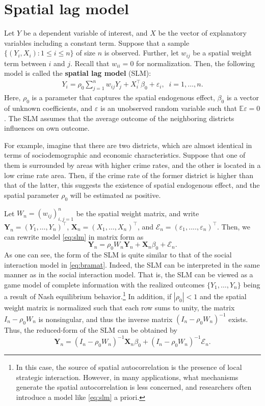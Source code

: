 \documentclass[10.5pt, A4paper, openany, uplatex]{book}
\newcommand{\mbf}{\mathbf}
\newcommand{\mcl}{\mathcal}
\newcommand{\eps}{\varepsilon}
\newcommand{\E}{\mathbb{E}}
\numberwithin{equation}{section}
\begin{document}
\section{Spatial lag model}\label{sec:SLM}

Let $Y$ be a dependent variable of interest, and $X$ be the vector of explanatory variables including a constant term.
Suppose that a sample $\{(Y_i,X_i): 1 \le i \le n\}$ of size $n$ is observed.
Further, let $w_{ij}$ be a spatial weight term between $i$ and $j$.
Recall that $w_{ii} = 0$ for normalization.
Then, the following model is called the \textbf{spatial lag model} (SLM):
\begin{align}\label{eq:slm}
	Y_i = \rho_0 \sum_{j = 1}^n w_{ij} Y_j + X_i^\top\beta_0 + \eps_i, \;\; i = 1,\ldots,n.
\end{align}
Here, $\rho_0$ is a parameter that captures the spatial endogenous effect, $\beta_0$ is a vector of unknown coefficients, and $\eps$ is an unobserved random variable such that $\E \eps = 0$.
The SLM assumes that the average outcome of the neighboring districts influences on own outcome.

For example, imagine that there are two districts, which are almost identical in terms of sociodemographic and economic characteristics.
Suppose that one of them is surrounded by areas with higher crime rates, and the other is  located in a low crime rate area.
Then, if the crime rate of the former district is higher than that of the latter, this suggests the existence of spatial endogenous effect, and the spatial parameter $\rho_0$ will be estimated as positive.

Let $W_n = (w_{ij})_{i,j = 1}^n$ be the spatial weight matrix, and write $\mbf{Y}_n = (Y_1, \ldots, Y_n)^\top$, $\mbf{X}_n = (X_1, \ldots , X_n)^\top$, and $\mcl{E}_n = (\eps_1, ...., \eps_n)^\top$.
Then, we can rewrite model \eqref{eq:slm} in matrix form as
\[
	\mbf{Y}_n =  \rho_0 W_n \mbf{Y}_n + \mbf{X}_n \beta_0 + \mcl{E}_n.
\]
As one can see, the form of the SLM is quite similar to that of the social interaction model in \eqref{eq:bramat}.
Indeed, the SLM can be interpreted in the same manner as in the social interaction model.
That is, the SLM can be viewed as a game model of complete information with the realized outcomes $\{Y_1, \ldots, Y_n \}$ being a result of Nash equilibrium behavior.\footnote{
	In this case, the source of spatial autocorrelation is the presence of local strategic interaction.
	However, in many applications, what mechanisms generate the spatial autocorrelation is less concerned, and researchers often introduce a model like \eqref{eq:slm} a priori.
}
In addition, if $|\rho_0| < 1$ and the spatial weight matrix is normalized such that each row sums to unity, the matrix $I_n - \rho_0 W_n$ is nonsingular, and thus the inverse matrix 
$(I_n - \rho_0 W_n)^{-1}$ exists.
Thus, the reduced-form of the SLM can be obtained by
\[
	\mbf{Y}_n =  (I_n - \rho_0 W_n)^{-1}\mbf{X}_n \beta_0 + (I_n - \rho_0 W_n)^{-1}\mcl{E}_n.
\]
\end{document}
